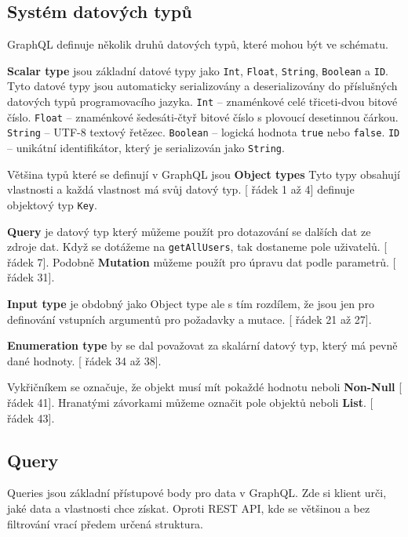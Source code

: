 \subsection{Systém datových typů}\label{sec:graphql:datatypes}
GraphQL definuje několik druhů datových typů, které mohou být ve schématu. \cite{graphqlDataTypes}

\textbf{Scalar type} jsou základní datové typy jako \texttt{Int}, \texttt{Float}, \texttt{String}, \texttt{Boolean} a \texttt{ID}. Tyto datové typy jsou automaticky serializovány a deserializovány do příslušných datových typů programovacího jazyka.
\texttt{Int} -- znaménkové celé třiceti-dvou bitové číslo.
\texttt{Float} -- znaménkové šedesáti-čtyř bitové číslo s plovoucí desetinnou čárkou.
\texttt{String} -- UTF-8 textový řetězec.
\texttt{Boolean} -- logická hodnota \texttt{true} nebo \texttt{false}.
\texttt{ID} -- unikátní identifikátor, který je serializován jako \texttt{String}.

Většina typů které se definují v GraphQL jsou \textbf{Object types} Tyto typy obsahují vlastnosti a každá vlastnost má svůj datový typ. [ řádek 1 až 4] definuje objektový typ \texttt{Key}.

\textbf{Query} je datový typ který můžeme použít pro dotazování se dalších dat ze zdroje dat. Když se dotážeme na \texttt{getAllUsers}, tak dostaneme pole uživatelů. [ řádek 7]. Podobně \textbf{Mutation} můžeme použít pro úpravu dat podle parametrů. [ řádek 31].

\textbf{Input type} je obdobný jako Object type ale s tím rozdílem, že jsou jen pro definování vstupních argumentů pro požadavky a mutace. [ řádek 21 až 27].

\textbf{Enumeration type} by se dal považovat za skalární datový typ, který má pevně dané hodnoty. [ řádek 34 až 38].

Vykřičníkem se označuje, že objekt musí mít pokaždé hodnotu neboli \textbf{Non-Null} [ řádek 41]. Hranatými závorkami můžeme označit pole objektů neboli \textbf{List}. [ řádek 43].

\subsection{Query}\label{sec:graphql:query}
Queries jsou základní přístupové body pro data v GraphQL. Zde si klient urči, jaké data a vlastnosti chce získat. Oproti REST API, kde se většinou a bez filtrování vrací předem určená struktura. \cite{enwiki:1219709983} \cite{graphqlQueries}

